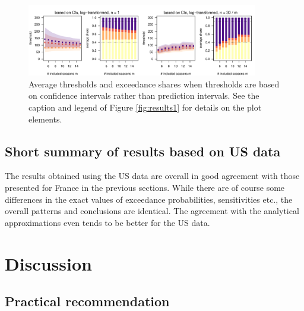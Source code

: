 \documentclass{article}
\begin{document}
\begin{figure}[h!]
\begin{center}
\includegraphics[width=0.9\textwidth]{figure/plot_ci_fr.pdf}
\end{center}
\caption{Average thresholds and exceedance shares when thresholds are based on confidence intervals rather than prediction intervals. See the caption and legend of Figure \ref{fig:results1} for details on the plot elements.}
\label{fig:cis}
\end{figure}

\subsection{Short summary of results based on US data}
\label{subsec:results_us}

The results obtained using the US data are overall in good agreement with those presented for France in the previous sections. While there are of course some differences in the exact values of exceedance probabilities, sensitivities etc., the overall patterns and conclusions are identical. The agreement with the analytical approximations even tends to be better for the US data. %

\section{Discussion}
\label{sec:discussion}

\subsection{Practical recommendation}
\end{document}
